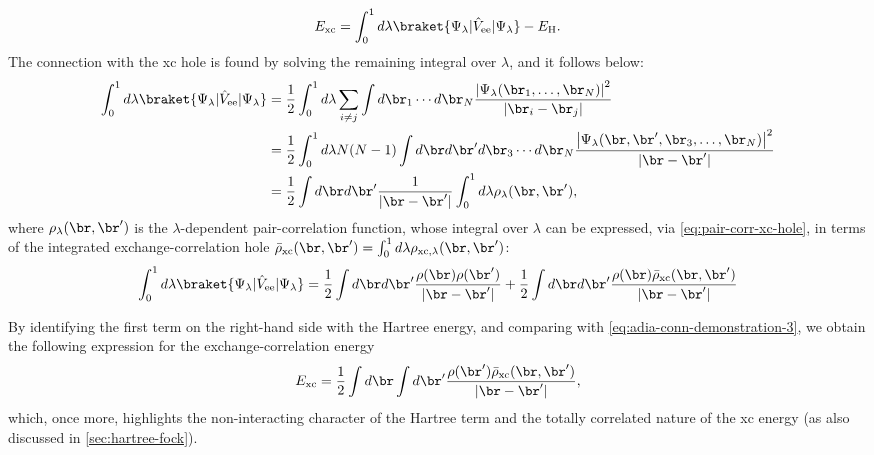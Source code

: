 %
\begin{equation}
    E_{\rm xc} = \int_0^1 d\lambda \braket{\Psi_{\lambda} | \hat{V}_{\rm ee} | \Psi_{\lambda}} - E_{\rm H} .
    \label{eq:adia-conn-demonstration-3}
\end{equation}
%
The connection with the xc hole is found by solving the remaining integral over $\lambda$, and it follows below:
%
\begin{equation}
    \begin{split}
    \int_0^1 d\lambda \braket{\Psi_{\lambda} | \hat{V}_{\rm ee} | \Psi_{\lambda}} &= \frac{1}{2} \int_0^1 d\lambda \sum_{i \neq j} \int d\br_1 \cdots d\br_N \frac{\left|\Psi_{\lambda}(\br_1, \dots, \br_N)\right|^2}{|\br_i - \br_j|} \\
    &= \frac{1}{2} \int_0^1 d\lambda N(N-1) \int d\br d\br' d\br_3 \cdots d\br_N \frac{\left|\Psi_{\lambda}(\br, \br', \br_3, \dots, \br_N)\right|^2}{|\br - \br'|} \\
    &= \frac{1}{2} \int d\br d\br' \frac{1}{|\br - \br'|} \int_0^1 d\lambda \rho_{\lambda}(\br,\br') ,
    \end{split}
    \label{eq:adia-conn-demonstration-4}
\end{equation}
%
where $\rho_{\lambda}(\br,\br')$ is the $\lambda$-dependent pair-correlation function, whose integral over $\lambda$ can be expressed, via \cref{eq:pair-corr-xc-hole}, in terms of the integrated exchange-correlation hole $\Bar{\rho}_{\rm xc}(\br,\br') = \int_0^1 d\lambda \rho_{\rm xc,\lambda}(\br,\br')$:
%
\begin{equation}
    \int_0^1 d\lambda \braket{\Psi_{\lambda} | \hat{V}_{\rm ee} | \Psi_{\lambda}} = \frac{1}{2} \int d\br d\br' \frac{\rho(\br) \rho(\br')}{|\br - \br'|} + \frac{1}{2} \int d\br d\br' \frac{\rho(\br) \Bar{\rho}_{\rm xc}(\br,\br')}{|\br - \br'|}
    \label{eq:adia-conn-demonstration-5}
\end{equation}

By identifying the first term on the right-hand side with the Hartree energy, and comparing with 
\cref{eq:adia-conn-demonstration-3}, we obtain the following expression for the exchange-correlation energy
%
\begin{equation}
    E_{\rm xc} = \frac{1}{2} \int d\br \int d\br' \frac{\rho(\br')\Bar{\rho}_{\rm xc}(\br,\br')}{|\br-\br'|} ,
    \label{eq:xc-ene-xc-hole}
\end{equation}
%
which, once more, highlights the non-interacting character of the Hartree term and the totally correlated nature of the xc energy (as also discussed in \cref{sec:hartree-fock}).

